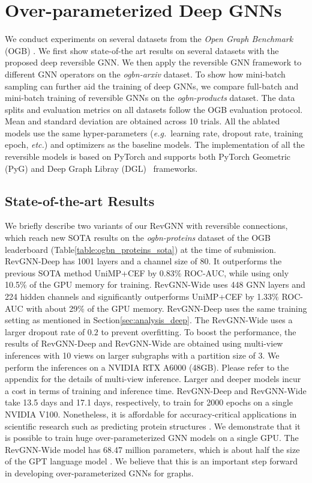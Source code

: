 \documentclass{article}
\newcommand{\eg}{\emph{e.g.~}}
\newcommand{\etc}{\emph{etc.\xspace}}
\newcommand{\secLabel}{Section\xspace}
\newcommand{\tblLabel}{Table\xspace}
\begin{document}
\section{Over-parameterized Deep GNNs}
We conduct experiments on several datasets from the \emph{Open Graph Benchmark} (OGB) \citep{hu2020open}. We first show state-of-the art results on several datasets with the proposed deep reversible GNN. We then apply the reversible GNN framework to different GNN operators on the \emph{ogbn-arxiv} dataset. To show how mini-batch sampling can further aid the training of deep GNNs, we compare full-batch and mini-batch training of reversible GNNs on the \emph{ogbn-products} dataset.
The data splits and evaluation metrics on all datasets follow the OGB evaluation protocol. Mean and standard deviation are obtained across 10 trials. All the ablated models use the same hyper-parameters (\eg learning rate, dropout rate, training epoch, \etc) and optimizers as the baseline models. The implementation of all the reversible models is based on PyTorch \citep{pytorch2019} and supports both PyTorch Geometric (PyG) \citep{Fey/Lenssen/2019} and Deep Graph Libray (DGL)~\citep{wang2019dgl} frameworks.

\subsection{State-of-the-art Results}
We briefly describe two variants of our RevGNN with reversible connections, which reach new SOTA results on the \emph{ogbn-proteins} dataset of the OGB leaderboard \citep{hu2020open} (\tblLabel \ref{table:ogbn_proteins_sota}) at the time of submission. RevGNN-Deep has 1001 layers and a channel size of 80. It outperforms the previous SOTA method UniMP+CEF by 0.83\% ROC-AUC, while using only 10.5\% of the GPU memory for training. RevGNN-Wide uses 448 GNN layers and 224 hidden channels and significantly outperforms UniMP+CEF by 1.33\% ROC-AUC with about 29\% of the GPU memory. RevGNN-Deep uses the same training setting as mentioned in \secLabel \ref{sec:analysis_deep}. The RevGNN-Wide uses a larger dropout rate of $0.2$ to prevent overfitting. To boost the performance, the results of RevGNN-Deep and RevGNN-Wide are obtained using multi-view inferences with 10 views on larger subgraphs with a partition size of 3. We perform the inferences on a NVIDIA RTX A6000 (48GB). Please refer to the appendix for the details of multi-view inference.
Larger and deeper models incur a cost in terms of training and inference time. RevGNN-Deep and RevGNN-Wide take 13.5 days and 17.1 days, respectively, to train for 2000 epochs on a single NVIDIA V100. Nonetheless, it is affordable for accuracy-critical applications in scientific research such as predicting protein structures \citep{senior2020improved}. We demonstrate that it is possible to train huge over-parameterized GNN models on a single GPU. The RevGNN-Wide model has 68.47 million parameters, which is about half the size of the GPT language model \citep{radford2018improving}. We believe that this is an important step forward in developing over-parameterized GNNs for graphs.
\end{document}
